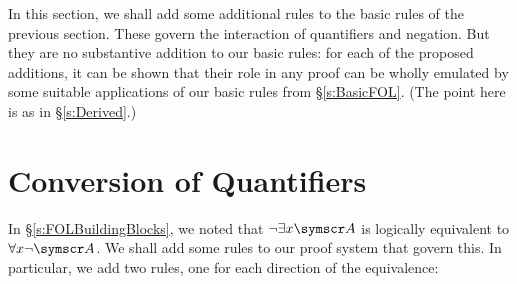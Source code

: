In this section, we shall add some additional rules to the basic rules of the previous section. These govern the interaction of quantifiers and negation. But they are no substantive addition to our basic rules: for each of the proposed additions, it can be shown that their role in any proof can be wholly emulated by some suitable applications of our basic rules from §\ref{s:BasicFOL}. (The point here is as in §\ref{s:Derived}.)
 
\section{Conversion of Quantifiers}\label{cq.rules}

In §\ref{s:FOLBuildingBlocks}, we noted that $\enot\exists x\meta{A}$ is logically equivalent to $\forall x \enot\meta{A}$. We shall add some rules to our proof system that govern this. In particular, we add two rules, one for each direction of the equivalence:

